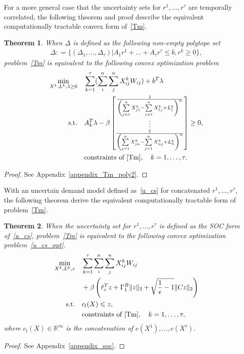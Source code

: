 \documentclass[10pt,twocolumn,twoside,english]{IEEEtran}
\newtheorem{theorem}{Theorem}
\begin{document}
For a more general case that the uncertainty sets for $r^1, \dots, r^{\tau}$ are temporally correlated, the following theorem and proof describe the equivalent computationally tractable convex form of~\eqref{Tm}. 
\begin{theorem}
When $\Delta$ is defined as the following non-empty polytope set
\begin{align}
\Delta : =\{(\Delta_1, \dots,\Delta_{\tau}) | A_1 r^1+\dots + A_{\tau} r^{\tau} \leq b, r^k \geq 0\},
\label{delta}
\end{align}
problem~\eqref{Tm} is equivalent to the following convex optimization problem 
\begin{align}
\begin{split}
\underset{X^k, L^k, \lambda \geq 0}{\text{min}} \quad&\sum_{k=1}^{\tau}(\sum_{i}^n \sum_{j}^n X^k_{ij} W_{ij})+b^T\lambda \\
\text{s.t.}\quad &A_k^T\lambda-\beta\begin{bmatrix} \frac{1}{\left (\sum\limits_{j=1}^{n} X^k_{j1}-\sum\limits_{j=1}^{n} X^k_{1j} + L^k_1 \right)^{\alpha}} \\ \vdots \\ \frac{1}{\left (\sum\limits_{j=1}^{n} X^k_{jn}-\sum\limits_{j=1}^{n} X^k_{nj} + L^k_n \right)^{\alpha}}\end{bmatrix}    \geq 0,\\
&\text{constraints of~\eqref{Tm}},\quad k=1,\dots, \tau.
\end{split}
\label{conv_Tm_dep}
\end{align}
\label{Tm_poly}
\end{theorem}
\begin{proof}
See Appendix~\ref{appendix_Tm_poly2}.
\end{proof}

With an uncertain demand model defined as~\eqref{u_cs} for concatenated $r^1, \dots, r^{\tau}$, the following theorem derive the equivalent computationally tractable form of problem~\eqref{Tm}.
\begin{theorem}
When the uncertainty set for $r^1, \dots, r^{\tau}$ is defined as the SOC form of~\eqref{u_cs}, problem~\eqref{Tm} is equivalent to the following convex optimization problem~\eqref{u_cs_opt}.
\begin{align}
\begin{split}
\underset{X^k, L^k, z}{\text{min}} \quad&\sum_{k=1}^{\tau}\sum_{i}^n \sum_{j}^n X^k_{ij} W_{ij}\\&+\beta \left(\hat{r}^T_c z+\Gamma_1^B \|z\|_2 +\sqrt{\frac{1}{\epsilon}-1} \|Cz\|_2\right)\\                                       
\text{s.t.}\quad  & c_l(X) \leqslant z,\\                                 
&\text{constraints of~\eqref{Tm}},\quad k=1,\dots, \tau,
\end{split}
\label{u_cs_opt}
\end{align}
where $c_l(X) \in \mathbb{R}^{\tau n}$ is the concatenation of $c(X^1), \dots, c(X^{\tau})$.
\label{theorem_soc}
\end{theorem}
\begin{proof}
See Appendix~\ref{appendix_soc}.
\end{proof}
\end{document}
